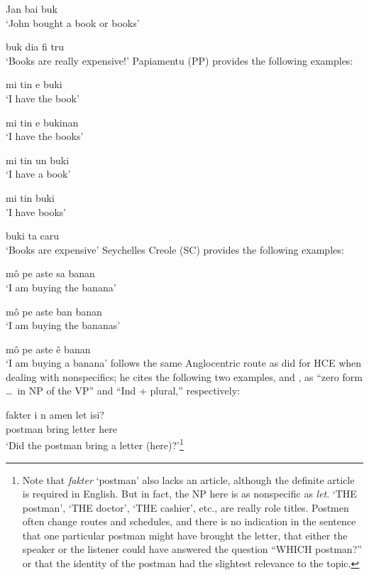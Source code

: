 \ea\label{ex:2:15}
Jan bai buk\\
\glt `John bought a book or books'
\z

\ea\label{ex:2:16}
 buk dia fi tru\\
\glt `Books are really expensive!'
\z
Papiamentu (PP) provides the following examples:

\ea\label{ex:2:17}
mi tin e buki\\
\glt `I have the book'
\z

\ea\label{ex:2:18}
mi tin e bukinan \\
\glt `I have the books'
\z

\ea\label{ex:2:19}
mi tin un buki\\
\glt `I have a book'
\z

\ea\label{ex:2:20}
mi tin buki\\
\glt  'I have books'
\z

\ea\label{ex:2:21}
buki ta caru \\
\glt `Books are expensive'
\z
Seychelles Creole (SC) provides the following examples:

\ea\label{ex:2:22}
 m\^o pe aste sa banan \\
\glt `I am buying the banana'
\z

\ea\label{ex:2:23}
m\^o pe aste ban banan\\
\glt `I am buying the bananas'
\z

\ea\label{ex:2:24}
 m\^o pe aste \^e banan\\
\glt `I am buying a banana'
\z
\citet[13]{Corne1977} follows the same Anglocentric route as \citet{Perlman1973} did for HCE when dealing with nonspecifics; he cites the following two examples,  and , as ``zero form \ldots~in NP of the VP'' and ``Ind + plural,'' respectively:

\ea\label{ex:2:25}
\gll fakter i n amen let isi?\\
postman {\PM} {\COMP} bring letter here\\
\glt `Did the postman bring a letter (here)?'\footnote{Note that \textit{fakter} `postman' also lacks an article, although the definite article is required in English. But in fact, the NP here is as nonspecific as \textit{let}. `THE postman', `THE doctor', `THE cashier', etc., are really role titles. Postmen often change routes and schedules, and there is no indication in the sentence that one particular postman might have brought the letter, that either the speaker or the listener could have answered the question ``WHICH postman?'' or that the identity of the postman had the slightest relevance to the topic.}
\z

